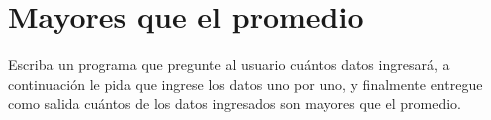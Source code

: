 \section{Mayores que el promedio}

Escriba un programa que pregunte al usuario cuántos datos ingresará, a
continuación le pida que ingrese los datos uno por uno, y finalmente
entregue como salida cuántos de los datos ingresados son mayores que el
promedio.
